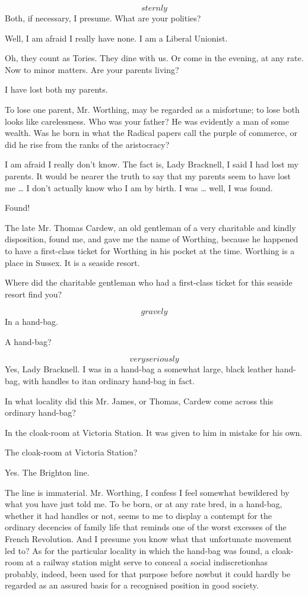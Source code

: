 \documentclass{book}
\begin{document}
\3  \[sternly\]  Both, if necessary, I presume.  What
are your polities?

\1  Well, I am afraid I really have none.  I am a Liberal
Unionist.

\3  Oh, they count as Tories.  They dine with us.  Or
come in the evening, at any rate.  Now to minor matters.  Are your
parents living?

\1  I have lost both my parents.

\3  To lose one parent, Mr. Worthing, may be regarded
as a misfortune; to lose both looks like carelessness.  Who was
your father?  He was evidently a man of some wealth.  Was he born
in what the Radical papers call the purple of commerce, or did he
rise from the ranks of the aristocracy?

\1  I am afraid I really don't know.  The fact is, Lady
Bracknell, I said I had lost my parents.  It would be nearer the
truth to say that my parents seem to have lost me \ldots{} I don't
actually know who I am by birth.  I was \ldots{} well, I was found.

\3  Found!

\1  The late Mr. Thomas Cardew, an old gentleman of a very
charitable and kindly disposition, found me, and gave me the name
of Worthing, because he happened to have a first-class ticket for
Worthing in his pocket at the time.  Worthing is a place in Sussex.
It is a seaside resort.

\3  Where did the charitable gentleman who had a
first-class ticket for this seaside resort find you?

\1  \[gravely\]  In a hand-bag.

\3  A hand-bag?

\1  \[very seriously\]  Yes, Lady Bracknell.  I was in a hand-bag%
\textemdash a somewhat large, black leather hand-bag, with handles to
it\textemdash an ordinary hand-bag in fact.

\3  In what locality did this Mr. James, or Thomas,
Cardew come across this ordinary hand-bag?

\1  In the cloak-room at Victoria Station.  It was given to him
in mistake for his own.

\3  The cloak-room at Victoria Station?

\1  Yes.  The Brighton line.

\3  The line is immaterial.  Mr. Worthing, I confess I
feel somewhat bewildered by what you have just told me.  To be
born, or at any rate bred, in a hand-bag, whether it had handles or
not, seems to me to display a contempt for the ordinary decencies
of family life that reminds one of the worst excesses of the French
Revolution.  And I presume you know what that unfortunate movement
led to?  As for the particular locality in which the hand-bag was
found, a cloak-room at a railway station might serve to conceal a
social indiscretion\textemdash has probably, indeed, been used for that
purpose before now\textemdash but it could hardly be regarded as an assured
basis for a recognised position in good society.
\end{document}
